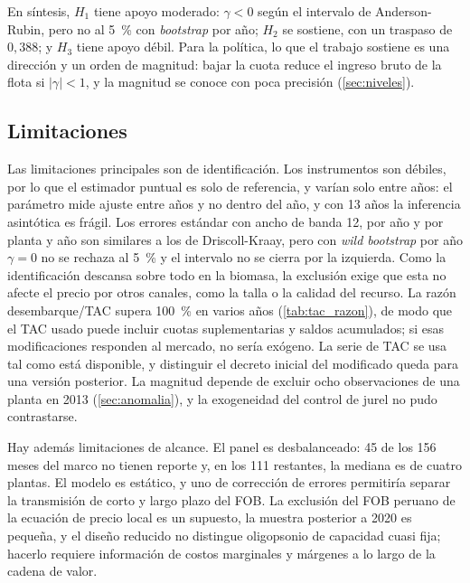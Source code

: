 \documentclass[11pt]{article}
\begin{document}
En síntesis, $H_1$ tiene apoyo moderado: $\gamma<0$ según el intervalo de Anderson-Rubin, pero no al 5~\% con \textit{bootstrap} por año; $H_2$ se sostiene, con un traspaso de $0{,}388$; y $H_3$ tiene apoyo débil. Para la política, lo que el trabajo sostiene es una dirección y un orden de magnitud: bajar la cuota reduce el ingreso bruto de la flota si $|\gamma|<1$, y la magnitud se conoce con poca precisión (\autoref{sec:niveles}).

\subsection{Limitaciones}\label{sec:limitaciones}

Las limitaciones principales son de identificación. Los instrumentos son débiles, por lo que el estimador puntual es solo de referencia, y varían solo entre años: el parámetro mide ajuste entre años y no dentro del año, y con 13 años la inferencia asintótica es frágil. Los errores estándar con ancho de banda 12, por año y por planta y año son similares a los de Driscoll-Kraay, pero con \textit{wild bootstrap} por año $\gamma=0$ no se rechaza al 5~\% y el intervalo no se cierra por la izquierda. Como la identificación descansa sobre todo en la biomasa, la exclusión exige que esta no afecte el precio por otros canales, como la talla o la calidad del recurso. La razón desembarque/TAC supera 100~\% en varios años (\autoref{tab:tac_razon}), de modo que el TAC usado puede incluir cuotas suplementarias y saldos acumulados; si esas modificaciones responden al mercado, no sería exógeno. La serie de TAC se usa tal como está disponible, y distinguir el decreto inicial del modificado queda para una versión posterior. La magnitud depende de excluir ocho observaciones de una planta en 2013 (\autoref{sec:anomalia}), y la exogeneidad del control de jurel no pudo contrastarse.

Hay además limitaciones de alcance. El panel es desbalanceado: 45 de los 156 meses del marco no tienen reporte y, en los 111 restantes, la mediana es de cuatro plantas. El modelo es estático, y uno de corrección de errores \parencite{klonaris2009} permitiría separar la transmisión de corto y largo plazo del FOB. La exclusión del FOB peruano de la ecuación de precio local es un supuesto, la muestra posterior a 2020 es pequeña, y el diseño reducido no distingue oligopsonio de capacidad cuasi fija; hacerlo requiere información de costos marginales y márgenes a lo largo de la cadena de valor.

\newpage\printbibliography
\end{document}
